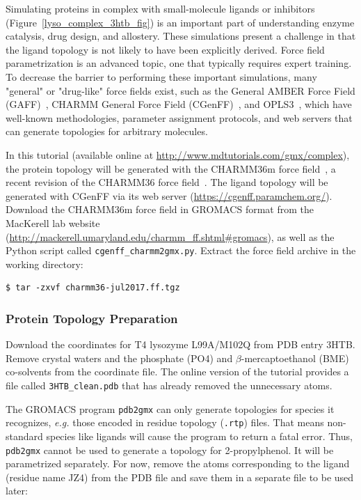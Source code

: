 \documentclass[9pt,tutorial,pubversion]{livecoms}
\newcommand{\urlstring}{http://www.mdtutorials.com/gmx}
\newcommand{\tutorialcomplex}{\url{\urlstring/complex}}
\begin{document}
Simulating proteins in complex with small-molecule ligands or inhibitors (Figure~\ref{lyso_complex_3htb_fig}) is an important part of understanding enzyme catalysis, drug design, and allostery. These simulations present a challenge in that the ligand topology is not likely to have been explicitly derived. Force field parametrization is an advanced topic, one that typically requires expert training. To decrease the barrier to performing these important simulations, many "general" or "drug-like" force fields exist, such as the General AMBER Force Field (GAFF)~\cite{Wang2004}, CHARMM General Force Field (CGenFF)~\cite{Vanommeslaeghe2010}, and OPLS3~\cite{Harder2016}, which have well-known methodologies, parameter assignment protocols, and web servers that can generate topologies for arbitrary molecules.

In this tutorial (available online at \tutorialcomplex), the protein topology will be generated with the CHARMM36m force field~\cite{Huang2016}, a recent revision of the CHARMM36 force field~\cite{Best2012}. The ligand topology will be generated with CGenFF via its web server (\url{https://cgenff.paramchem.org/}). Download the CHARMM36m force field in GROMACS format from the MacKerell lab website (\url{http://mackerell.umaryland.edu/charmm_ff.shtml#gromacs}), as well as the Python script called \texttt{cgenff\_charmm2gmx.py}. Extract the force field archive in the working directory:

\begin{lstlisting}
$ tar -zxvf charmm36-jul2017.ff.tgz
\end{lstlisting}

\subsubsection{Protein Topology Preparation} \label{complex_top}

Download the coordinates for T4 lysozyme L99A/M102Q from PDB entry 3HTB. Remove crystal waters and the phosphate (PO4) and $\beta$-mercaptoethanol (BME) co-solvents from the coordinate file. The online version of the tutorial provides a file called \texttt{3HTB\_clean.pdb} that has already removed the unnecessary atoms.

The GROMACS program \texttt{pdb2gmx} can only generate topologies for species it recognizes, {\em e.g.} those encoded in residue topology (\texttt{.rtp}) files. That means non-standard species like ligands will cause the program to return a fatal error. Thus, \texttt{pdb2gmx} cannot be used to generate a topology for 2-propylphenol. It will be parametrized separately. For now, remove the atoms corresponding to the ligand (residue name JZ4) from the PDB file and save them in a separate file to be used later:
\end{document}
